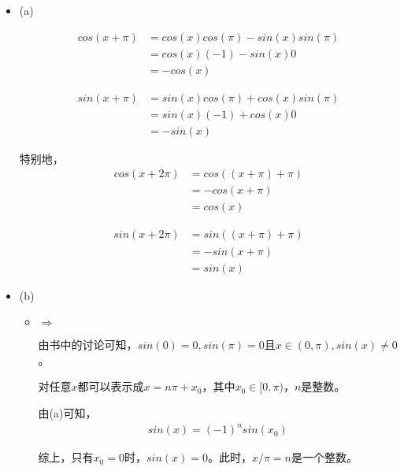 \documentclass{article}
\begin{document}
\begin{itemize}
  \item (a)

        \begin{align*}
          cos(x + \pi) & = cos(x)cos(\pi) - sin(x)sin(\pi) \\
                       & = cos(x)(-1) - sin(x)0            \\
                       & = -cos(x)
        \end{align*}

        \begin{align*}
          sin(x + \pi) & = sin(x)cos(\pi) + cos(x)sin(\pi) \\
                       & = sin(x)(-1) + cos(x)0            \\
                       & = -sin(x)
        \end{align*}

        特别地，
        \begin{align*}
          cos(x + 2\pi) & = cos((x + \pi) + \pi) \\
                        & = -cos(x + \pi)        \\
                        & = cos(x)
        \end{align*}

        \begin{align*}
          sin(x + 2\pi) & = sin((x + \pi) + \pi) \\
                        & = -sin(x + \pi)        \\
                        & = sin(x)
        \end{align*}

  \item (b)

        \begin{itemize}
          \item $\Rightarrow$

                由书中的讨论可知，$sin(0) = 0, sin(\pi) = 0$且$x \in (0, \pi), sin(x) \neq 0$。

                对任意$x$都可以表示成$x = n\pi + x_0$，其中$x_0 \in [0, \pi)$，$n$是整数。

                由(a)可知，
                \begin{align*}
                  sin(x) = (-1)^nsin(x_0)
                \end{align*}

                综上，只有$x_0 = 0$时，$sin(x) = 0$。此时，$x/\pi = n$是一个整数。



\end{itemize}
\end{itemize}
\end{document}
